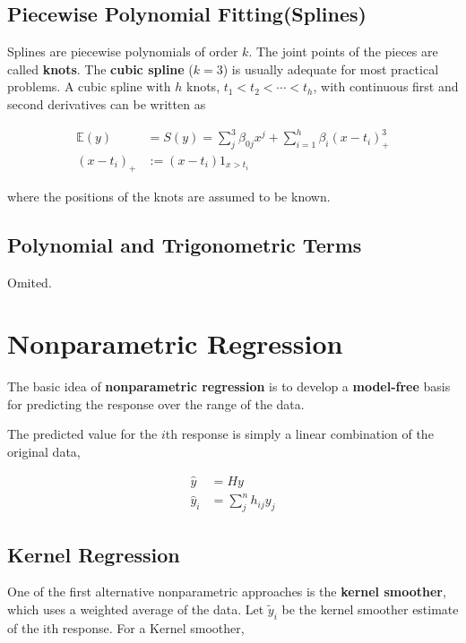 \documentclass[12pt]{article}
\begin{document}
\subsection{Piecewise Polynomial Fitting(Splines)}

Splines are piecewise polynomials of order $k$. The joint points of the pieces are called \textbf{knots}. The \textbf{cubic spline} ($k=3$) is usually adequate for most practical problems. A cubic spline with $h$ knots, $t_1 < t_2 < \cdots < t_h$, with continuous first and second derivatives can be written as

$$
\begin{aligned}
\mathbb{E}(y) &= S(y) = \sum_j^3 \beta_{0j}x^j + \sum_{i=1}^h \beta_i ( x - t_i)^3_+ \\[10pt]
(x - t_i)_+ &:= (x - t_i) 1_{x > t_i}
\end{aligned}
$$

where the positions of the knots are assumed to be known. 

\subsection{Polynomial and Trigonometric Terms}

Omited.


\section{Nonparametric Regression}

The basic idea of \textbf{nonparametric regression} is to develop a \textbf{model-free} basis for predicting the response over the range of the data. 

The predicted value for the $i$th response is simply a linear combination of the original data,

$$
\begin{aligned}
\hat{y} &= Hy \\[8pt]
\hat{y}_i &= \sum_j^n h_{ij}y_j
\end{aligned}
$$


\subsection{Kernel Regression}

One of the first alternative nonparametric approaches is the \textbf{kernel smoother}, which uses a weighted average of the data. Let $\tilde{y}_i$ be the kernel smoother estimate of the ith response. For a Kernel smoother,
\end{document}
